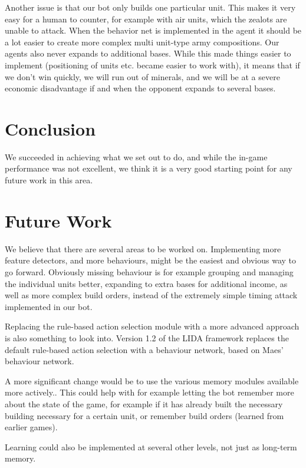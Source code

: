 Another issue is that our bot only builds one particular unit. This makes it very easy for a human to counter, for example with air units, which the zealots are unable to attack. When the behavior net is implemented in the agent it should be a lot easier to create more complex multi unit-type army compositions.
Our agents also never expands to additional bases. While this made things easier to implement (positioning of units etc. became easier to work with), it means that if we don't win quickly, we will run out of minerals, and we will be at a severe economic disadvantage if and when the opponent expands to several bases.

\section{Conclusion}
\label{sec:conclusion}
We succeeded in achieving what we set out to do, and while the in-game performance was not excellent, we think it is a very good starting point for any future work in this area.

\section{Future Work}
\label{sec:futurework}
We believe that there are several areas to be worked on. Implementing more feature detectors, and more behaviours, might be the easiest and obvious way to go forward. Obviously missing behaviour is for example grouping and managing the individual units better, expanding to extra bases for additional income, as well as more complex build orders, instead of the extremely simple timing attack implemented in our bot.

Replacing the rule-based action selection module with a more advanced approach is also something to look into. Version 1.2 of the LIDA framework replaces the default rule-based action selection with a behaviour network, based on Maes' behaviour network.\cite{maes1989right}

A more significant change would be to use the various memory modules available more actively.\cite{franklin2007lida}. This could help with for example letting the bot remember more about the state of the game, for example if it has already built the necessary building necessary for a certain unit, or remember build orders (learned from earlier games).

Learning could also be implemented at several other levels, not just as long-term memory.
